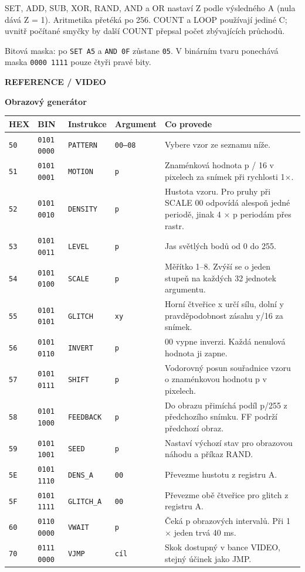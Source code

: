 \documentclass[11pt,a4paper]{article}
\newcommand{\tagline}[1]{{\sffamily\bfseries\color{accent}\small #1}\par}
\newcommand{\titleline}[1]{{\sffamily\bfseries\fontsize{25}{29}\selectfont #1\par}\vspace{2mm}}
\newcommand{\note}[1]{\par\vspace{2mm}\noindent\colorbox{pale}{\parbox{.96\linewidth}{\raggedright #1}}\par}
\begin{document}
SET, ADD, SUB, XOR, RAND, AND a OR nastaví Z podle výsledného A (nula dává Z = 1). Aritmetika přetéká po 256. COUNT a LOOP používají jediné C; uvnitř počítané smyčky by další COUNT přepsal počet zbývajících průchodů.

\note{Bitová maska: po \texttt{SET A5} a \texttt{AND 0F} zůstane \texttt{05}. V binárním tvaru ponechává maska \texttt{0000 1111} pouze čtyři pravé bity.}
\clearpage
\tagline{REFERENCE  /  VIDEO}
\titleline{Obrazový generátor}
{\small\begin{tabularx}{\linewidth}{@{}llllX@{}}\toprule
\textbf{HEX} & \textbf{BIN} & \textbf{Instrukce} & \textbf{Argument} & \textbf{Co provede}\\\midrule
\texttt{50} & \texttt{0101 0000} & \texttt{PATTERN} & \texttt{00--08} & Vybere vzor ze seznamu níže.\\
\texttt{51} & \texttt{0101 0001} & \texttt{MOTION} & \texttt{p} & Znaménková hodnota p / 16 v pixelech za snímek při rychlosti 1\ensuremath{\times}.\\
\texttt{52} & \texttt{0101 0010} & \texttt{DENSITY} & \texttt{p} & Hustota vzoru. Pro pruhy při SCALE 00 odpovídá alespoň jedné periodě, jinak 4 \ensuremath{\times} p periodám přes rastr.\\
\texttt{53} & \texttt{0101 0011} & \texttt{LEVEL} & \texttt{p} & Jas světlých bodů od 0 do 255.\\
\texttt{54} & \texttt{0101 0100} & \texttt{SCALE} & \texttt{p} & Měřítko 1--8. Zvýší se o jeden stupeň na každých 32 jednotek argumentu.\\
\texttt{55} & \texttt{0101 0101} & \texttt{GLITCH} & \texttt{xy} & Horní čtveřice x určí sílu, dolní y pravděpodobnost zásahu y/16 za snímek.\\
\texttt{56} & \texttt{0101 0110} & \texttt{INVERT} & \texttt{p} & 00 vypne inverzi. Každá nenulová hodnota ji zapne.\\
\texttt{57} & \texttt{0101 0111} & \texttt{SHIFT} & \texttt{p} & Vodorovný posun souřadnice vzoru o znaménkovou hodnotu p v pixelech.\\
\texttt{58} & \texttt{0101 1000} & \texttt{FEEDBACK} & \texttt{p} & Do obrazu přimíchá podíl p/255 z předchozího snímku. FF podrží předchozí obraz.\\
\texttt{59} & \texttt{0101 1001} & \texttt{SEED} & \texttt{p} & Nastaví výchozí stav pro obrazovou náhodu a příkaz RAND.\\
\texttt{5E} & \texttt{0101 1110} & \texttt{DENS\_A} & \texttt{00} & Převezme hustotu z registru A.\\
\texttt{5F} & \texttt{0101 1111} & \texttt{GLITCH\_A} & \texttt{00} & Převezme obě čtveřice pro glitch z registru A.\\
\texttt{60} & \texttt{0110 0000} & \texttt{VWAIT} & \texttt{p} & Čeká p obrazových intervalů. Při 1\ensuremath{\times} jeden trvá 40 ms.\\
\texttt{70} & \texttt{0111 0000} & \texttt{VJMP} & \texttt{cíl} & Skok dostupný v bance VIDEO, stejný účinek jako JMP.\\
\bottomrule\end{tabularx}}\par
\end{document}

